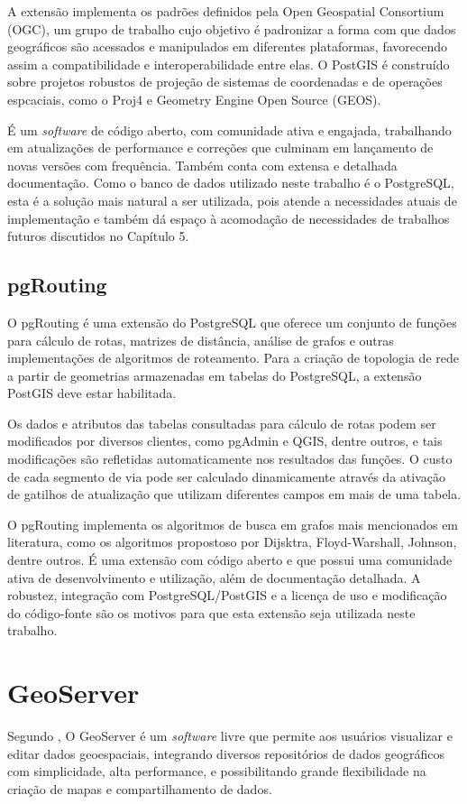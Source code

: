 \documentclass[oneside,openright,12pt]{ufsm_2015} %
\begin{document}
A extensão implementa os padrões definidos pela Open Geospatial Consortium (OGC), um grupo de trabalho cujo objetivo é padronizar a forma com que dados geográficos são acessados e manipulados em diferentes plataformas, favorecendo assim a compatibilidade e interoperabilidade entre elas. 
O PostGIS é construído sobre projetos robustos de projeção de sistemas de coordenadas e de operações espcaciais, como o Proj4 e Geometry Engine Open Source (GEOS).

É um \textit{software} de código aberto, com comunidade ativa e engajada, trabalhando em atualizações de performance e correções que culminam em lançamento de novas versões com frequência. 
Também conta com extensa e detalhada documentação. 
Como o banco de dados utilizado neste trabalho é o PostgreSQL, esta é a solução mais natural a ser utilizada, pois atende a necessidades atuais de implementação e também dá espaço à acomodação de necessidades de trabalhos futuros discutidos no Capítulo 5.


\subsection{pgRouting}
O pgRouting é uma extensão do PostgreSQL que oferece um conjunto de funções para cálculo de rotas, matrizes de distância, análise de grafos e outras implementações de algoritmos de roteamento. 
Para a criação de topologia de rede a partir de geometrias armazenadas em tabelas do PostgreSQL, a extensão PostGIS deve estar habilitada.

Os dados e atributos das tabelas consultadas para cálculo de rotas podem ser modificados por diversos clientes, como pgAdmin e QGIS, dentre outros, e tais modificações são refletidas automaticamente nos resultados das funções. 
O custo de cada segmento de via pode ser calculado dinamicamente através da ativação de gatilhos de atualização que utilizam diferentes campos em mais de uma tabela.

O pgRouting implementa os algoritmos de busca em grafos mais mencionados em literatura, como os algoritmos propostoso por Dijsktra, Floyd-Warshall, Johnson, dentre outros.
É uma extensão com código aberto e que possui uma comunidade ativa de desenvolvimento e utilização, além de documentação detalhada. 
A robustez, integração com PostgreSQL/PostGIS e a licença de uso e modificação do código-fonte são os motivos para que esta extensão seja utilizada neste trabalho.

\section{GeoServer}
Segundo , O GeoServer é um \textit{software} livre que permite aos usuários visualizar e editar dados geoespaciais, integrando diversos repositórios de dados geográficos com simplicidade, alta performance, e possibilitando grande flexibilidade na criação de mapas e compartilhamento de dados.
\end{document}
